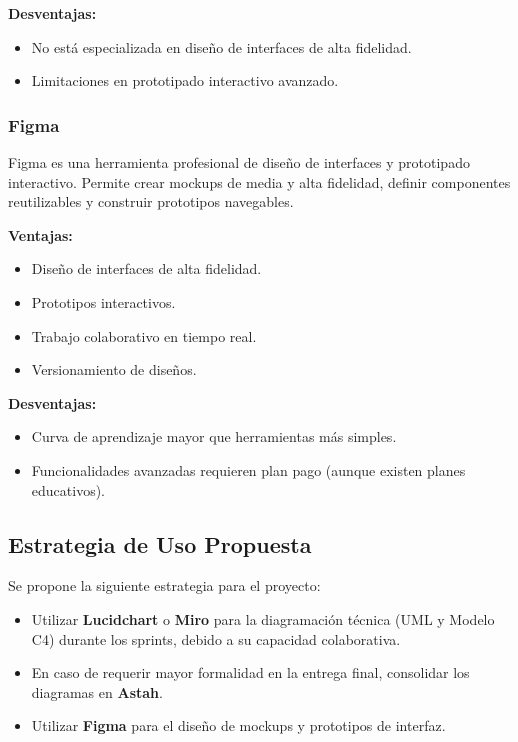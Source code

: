 \documentclass[12pt]{article}
\begin{document}
\textbf{Desventajas:}
\begin{itemize}
    \item No está especializada en diseño de interfaces de alta fidelidad.
    \item Limitaciones en prototipado interactivo avanzado.
\end{itemize}

\subsubsection{Figma}

Figma es una herramienta profesional de diseño de interfaces y prototipado interactivo. Permite crear mockups de media y alta fidelidad, definir componentes reutilizables y construir prototipos navegables.

\textbf{Ventajas:}
\begin{itemize}
    \item Diseño de interfaces de alta fidelidad.
    \item Prototipos interactivos.
    \item Trabajo colaborativo en tiempo real.
    \item Versionamiento de diseños.
\end{itemize}

\textbf{Desventajas:}
\begin{itemize}
    \item Curva de aprendizaje mayor que herramientas más simples.
    \item Funcionalidades avanzadas requieren plan pago (aunque existen planes educativos).
\end{itemize}

\subsection{Estrategia de Uso Propuesta}

Se propone la siguiente estrategia para el proyecto:

\begin{itemize}
    \item Utilizar \textbf{Lucidchart} o \textbf{Miro} para la diagramación técnica (UML y Modelo C4) durante los sprints, debido a su capacidad colaborativa.
    \item En caso de requerir mayor formalidad en la entrega final, consolidar los diagramas en \textbf{Astah}.
    \item Utilizar \textbf{Figma} para el diseño de mockups y prototipos de interfaz.
\end{itemize}
\end{document}
